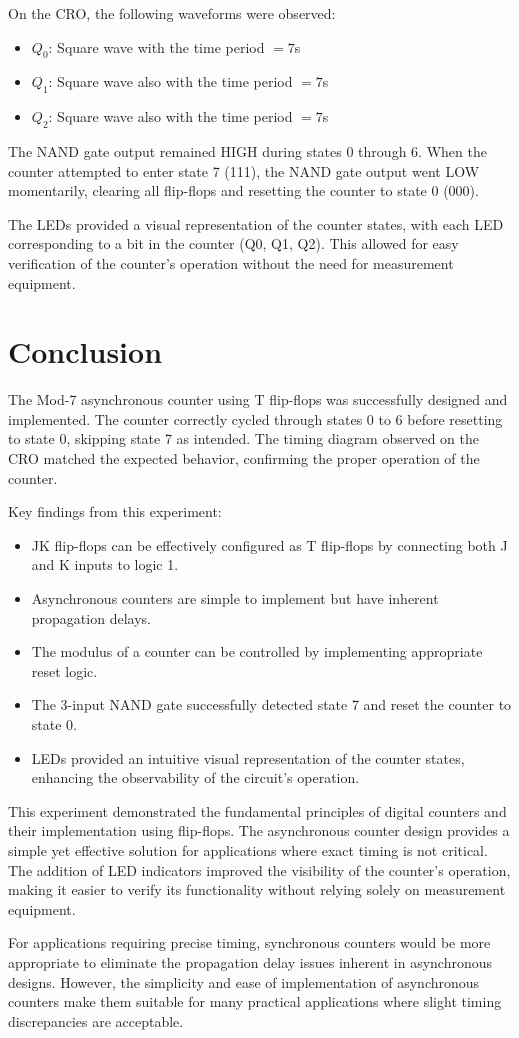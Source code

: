 \documentclass[12pt]{article}
\begin{document}
On the CRO, the following waveforms were observed:
\begin{itemize}
    \item $Q_0$: Square wave with the time period $= 7$s
    \item $Q_1$: Square wave also with the time period $= 7$s
    \item $Q_2$: Square wave also with the time period $= 7$s
\end{itemize}

The NAND gate output remained HIGH during states 0 through 6. When the counter attempted to enter state 7 (111), the NAND gate output went LOW momentarily, clearing all flip-flops and resetting the counter to state 0 (000).

The LEDs provided a visual representation of the counter states, with each LED corresponding to a bit in the counter (Q0, Q1, Q2). This allowed for easy verification of the counter's operation without the need for measurement equipment.

\section{Conclusion}

The Mod-7 asynchronous counter using T flip-flops was successfully designed and implemented. The counter correctly cycled through states 0 to 6 before resetting to state 0, skipping state 7 as intended. The timing diagram observed on the CRO matched the expected behavior, confirming the proper operation of the counter.

Key findings from this experiment:
\begin{itemize}
    \item JK flip-flops can be effectively configured as T flip-flops by connecting both J and K inputs to logic 1.
    \item Asynchronous counters are simple to implement but have inherent propagation delays.
    \item The modulus of a counter can be controlled by implementing appropriate reset logic.
    \item The 3-input NAND gate successfully detected state 7 and reset the counter to state 0.
    \item LEDs provided an intuitive visual representation of the counter states, enhancing the observability of the circuit's operation.
\end{itemize}

This experiment demonstrated the fundamental principles of digital counters and their implementation using flip-flops. The asynchronous counter design provides a simple yet effective solution for applications where exact timing is not critical. The addition of LED indicators improved the visibility of the counter's operation, making it easier to verify its functionality without relying solely on measurement equipment.

For applications requiring precise timing, synchronous counters would be more appropriate to eliminate the propagation delay issues inherent in asynchronous designs. However, the simplicity and ease of implementation of asynchronous counters make them suitable for many practical applications where slight timing discrepancies are acceptable.
\end{document}
